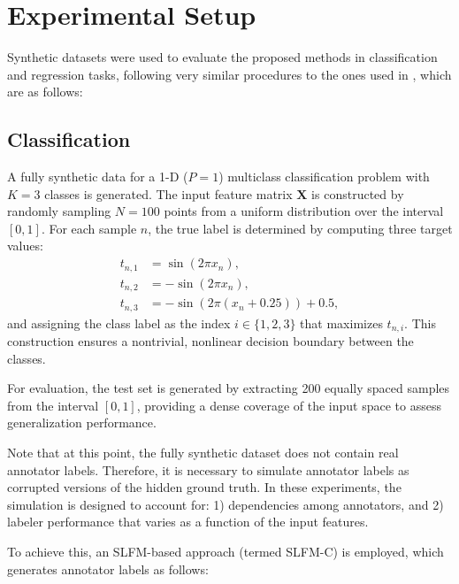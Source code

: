 \section{Experimental Setup}\label{sec:experiments}

Synthetic datasets were used to evaluate the proposed methods in
classification and regression tasks, following very similar
procedures to the ones used in \cite{GilGonzalezEtAl2023}, which
are as follows:

\subsection{Classification}

A fully synthetic data for a 1-D ($P=1$) multiclass classification
problem with $K=3$ classes is generated. The input feature matrix
$\mathbf{X}$ is constructed by randomly sampling $N=100$ points from
a uniform distribution over the interval $[0, 1]$. For each sample
$n$, the true label is determined by computing three target values:
\begin{align*}
  t_{n,1} &= \sin(2\pi x_n), \\
  t_{n,2} &= -\sin(2\pi x_n), \\
  t_{n,3} &= -\sin(2\pi (x_n + 0.25)) + 0.5,
\end{align*}
and assigning the class label as the index $i \in \{1, 2, 3\}$ that
maximizes $t_{n,i}$. This construction ensures a nontrivial,
nonlinear decision boundary between the classes.

For evaluation, the test set is generated by extracting 200 equally
spaced samples from the interval $[0, 1]$, providing a dense coverage
of the input space to assess generalization performance.

Note that at this point, the fully synthetic dataset does not
contain real annotator labels. Therefore, it is necessary to simulate
annotator labels as corrupted versions of the hidden ground truth. In
these experiments, the simulation is designed to account for: 1)
dependencies among annotators, and 2) labeler performance that varies
as a function of the input features.

To achieve this, an \gls{SLFM}-based approach (termed SLFM-C) is employed,
which generates annotator labels as follows:


